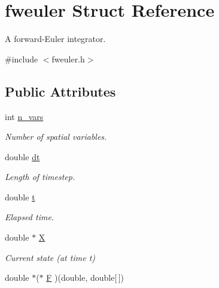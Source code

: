 \hypertarget{structfweuler}{}\section{fweuler Struct Reference}
\label{structfweuler}


A forward-\/\+Euler integrator.  




{\ttfamily \#include $<$fweuler.\+h$>$}

\subsection*{Public Attributes}
\begin{DoxyCompactItemize}
\item 
\hypertarget{structfweuler_a79f8c4cfdb9adfa253c8b4c037c237f8}{}int \hyperlink{structfweuler_a79f8c4cfdb9adfa253c8b4c037c237f8}{n\+\_\+vars}\label{structfweuler_a79f8c4cfdb9adfa253c8b4c037c237f8}

\begin{DoxyCompactList}\small\item\em Number of spatial variables. \end{DoxyCompactList}\item 
\hypertarget{structfweuler_aaaa8f46ce07dde8c2f1d3fbb0097d166}{}double \hyperlink{structfweuler_aaaa8f46ce07dde8c2f1d3fbb0097d166}{dt}\label{structfweuler_aaaa8f46ce07dde8c2f1d3fbb0097d166}

\begin{DoxyCompactList}\small\item\em Length of timestep. \end{DoxyCompactList}\item 
\hypertarget{structfweuler_ab00dd0addf40e99c6abe9e65f5e140d5}{}double \hyperlink{structfweuler_ab00dd0addf40e99c6abe9e65f5e140d5}{t}\label{structfweuler_ab00dd0addf40e99c6abe9e65f5e140d5}

\begin{DoxyCompactList}\small\item\em Elapsed time. \end{DoxyCompactList}\item 
\hypertarget{structfweuler_ae6a7a8f3084e4a42a4c7da4c4a36dcc0}{}double $\ast$ \hyperlink{structfweuler_ae6a7a8f3084e4a42a4c7da4c4a36dcc0}{X}\label{structfweuler_ae6a7a8f3084e4a42a4c7da4c4a36dcc0}

\begin{DoxyCompactList}\small\item\em Current state (at time t) \end{DoxyCompactList}\item 
\hypertarget{structfweuler_aa4e9973fa09e3f186f5bf3e0c7ae2c2e}{}double $\ast$($\ast$ \hyperlink{structfweuler_aa4e9973fa09e3f186f5bf3e0c7ae2c2e}{F} )(double, double\mbox{[}$\,$\mbox{]})\label{structfweuler_aa4e9973fa09e3f186f5bf3e0c7ae2c2e}


\end{DoxyCompactItemize}
